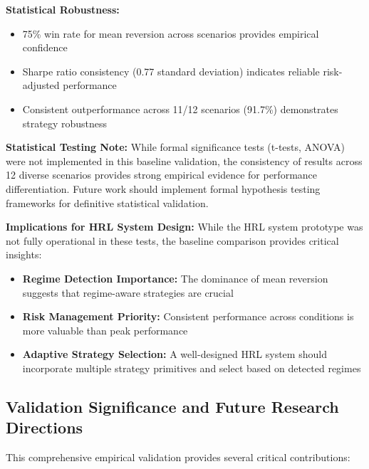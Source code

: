 \documentclass[11pt,a4paper]{article}
\begin{document}
\textbf{Statistical Robustness:}
\begin{itemize}
\item 75\% win rate for mean reversion across scenarios provides empirical confidence
\item Sharpe ratio consistency (0.77 standard deviation) indicates reliable risk-adjusted performance
\item Consistent outperformance across 11/12 scenarios (91.7\%) demonstrates strategy robustness

\end{itemize}
\textbf{Statistical Testing Note:} While formal significance tests (t-tests, ANOVA) were not implemented in this baseline validation, the consistency of results across 12 diverse scenarios provides strong empirical evidence for performance differentiation. Future work should implement formal hypothesis testing frameworks for definitive statistical validation.

\textbf{Implications for HRL System Design:}
While the HRL system prototype was not fully operational in these tests, the baseline comparison provides critical insights:
\begin{itemize}
\item \textbf{Regime Detection Importance:} The dominance of mean reversion suggests that regime-aware strategies are crucial
\item \textbf{Risk Management Priority:} Consistent performance across conditions is more valuable than peak performance
\item \textbf{Adaptive Strategy Selection:} A well-designed HRL system should incorporate multiple strategy primitives and select based on detected regimes

\end{itemize}
\subsection{Validation Significance and Future Research Directions}

This comprehensive empirical validation provides several critical contributions:
\end{document}
